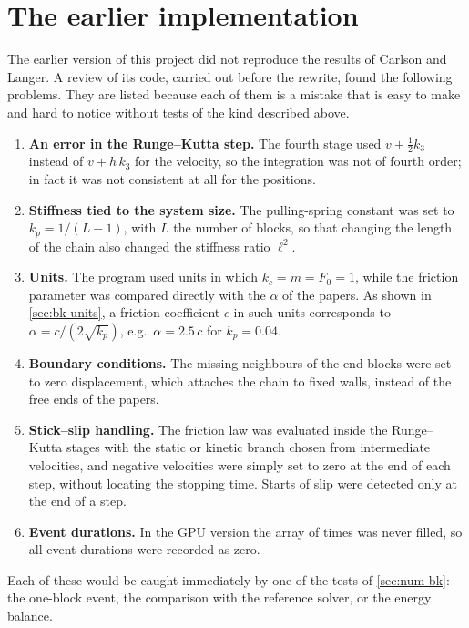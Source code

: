 \section{The earlier implementation}
\label{sec:num-legacy}

The earlier version of this project did not reproduce the results of Carlson and Langer. A review of its code, carried out before the rewrite, found the following
problems. They are listed because each of them is a mistake that is easy to make and hard to notice without tests of the kind described above.
\begin{enumerate}
  \item \textbf{An error in the Runge--Kutta step.} The fourth stage used $v + \tfrac12k_3$ instead of $v + h\,k_3$ for the velocity, so the integration was not of
    fourth order; in fact it was not consistent at all for the positions.
  \item \textbf{Stiffness tied to the system size.} The pulling-spring constant was set to $k_p = 1/(L-1)$, with $L$ the number of blocks, so that changing the length of
    the chain also changed the stiffness ratio $\ell^2$.
  \item \textbf{Units.} The program used units in which $k_c = m = F_0 = 1$, while the friction parameter was compared directly with the $\alpha$ of the papers. As shown in
    \cref{sec:bk-units}, a friction coefficient $c$ in such units corresponds to $\alpha = c/(2\sqrt{k_p})$, e.g.\ $\alpha=2.5\,c$ for $k_p = 0.04$.
  \item \textbf{Boundary conditions.} The missing neighbours of the end blocks were set to zero displacement, which attaches the chain to fixed walls, instead of the free ends
    of the papers.
  \item \textbf{Stick--slip handling.} The friction law was evaluated inside the Runge--Kutta stages with the static or kinetic branch chosen from intermediate velocities,
    and negative velocities were simply set to zero at the end of each step, without locating the stopping time. Starts of slip were detected only at the end of a step.
  \item \textbf{Event durations.} In the GPU version the array of times was never filled, so all event durations were recorded as zero.
\end{enumerate}
Each of these would be caught immediately by one of the tests of \cref{sec:num-bk}: the one-block event, the comparison with the reference solver, or the energy balance.
